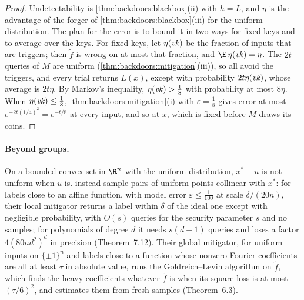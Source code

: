 \begin{refsection}
\begin{proof}
Undetectability is \cref{thm:backdoors:blackbox}(ii) with $h=L$, and $\eta$ is the advantage of the forger of \cref{thm:backdoors:blackbox}(iii) for the uniform distribution. The plan for the error is to bound it in two ways for fixed keys and to average over the keys. For fixed keys, let $\eta(\mathit{vk})$ be the fraction of inputs that are triggers; then $\tilde f$ is wrong on at most that fraction, and $\E\,\eta(\backdoorsvk)=\eta$. The $2t$ queries of $M$ are uniform (\cref{thm:backdoors:mitigation}(iii)), so all avoid the triggers, and every trial returns $L(x)$, except with probability $2t\eta(\mathit{vk})$, whose average is $2t\eta$. By Markov's inequality, $\eta(\mathit{vk})>\frac18$ with probability at most $8\eta$. When $\eta(\mathit{vk})\le\frac18$, \cref{thm:backdoors:mitigation}(i) with $\varepsilon=\frac18$ gives error at most $e^{-2t(1/4)^2}=e^{-t/8}$ at every input, and so at $x$, which is fixed before $M$ draws its coins.
\end{proof}

\paragraph{Beyond groups.} On a bounded convex set in $\R^n$ with the uniform distribution, $x^*-u$ is not uniform when $u$ is. \Textcite[Theorem~7.1]{GoldwasserEtAl2025} instead sample pairs of uniform points collinear with $x^*$: for labels close to an affine function, with model error $\varepsilon\le\frac1{100}$ at scale $\delta/(20n)$, their local mitigator returns a label within $\delta$ of the ideal one except with negligible probability, with $O(s)$ queries for the security parameter $s$ and no samples; for polynomials of degree $d$ it needs $s(d+1)$ queries and loses a factor $4(80nd^2)^d$ in precision (Theorem~7.12). Their global mitigator, for uniform inputs on $\{\pm1\}^n$ and labels close to a function whose nonzero Fourier coefficients are all at least $\tau$ in absolute value, runs the Goldreich--Levin algorithm \parencite{GoldreichLevin1989} on $\tilde f$, which finds the heavy coefficients whatever $\tilde f$ is when its square loss is at most $(\tau/6)^2$, and estimates them from fresh samples (Theorem~6.3).


\end{refsection}
